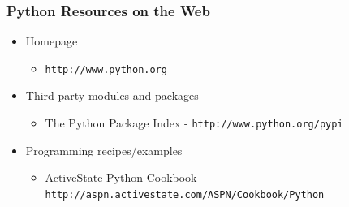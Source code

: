 \documentclass{beamer}
\begin{document}
\begin{frame}
  \frametitle{Python Resources on the Web}
\begin{itemize}

\item Homepage
\begin{itemize}
	\item \texttt{http://www.python.org}
\end{itemize}

\item Third party modules and packages
\begin{itemize}
	\item The Python Package Index - \texttt{http://www.python.org/pypi}
\end{itemize}

\item Programming recipes/examples
\begin{itemize}
	\item ActiveState Python Cookbook - \texttt{http://aspn.activestate.com/ASPN/Cookbook/Python}
\end{itemize}

\end{itemize}

\end{frame}
\end{document}
